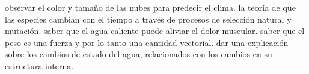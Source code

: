 \documentclass[12pt,addpoints]{repaso}
\begin{document}
\begin{questions}
{\begin{multicols}{2}
\begin{parts}
                      \begin{checkboxes}
                           \CorrectChoice observar el color y tamaño de las nubes para predecir el clima.
                           \choice la teoría de que las especies cambian con el tiempo a través de procesos de selección natural y mutación.
                           \CorrectChoice saber que el agua caliente puede aliviar el dolor muscular.
                           \choice saber que el peso es una fuerza y por lo tanto una cantidad vectorial.
                           \choice dar una explicación sobre los cambios de estado del agua, relacionados con los cambios en su estructura interna.
                      \end{checkboxes}
  
                     
  
  
                 \end{parts}
            \end{multicols}
       }

\end{questions}
\end{document}
